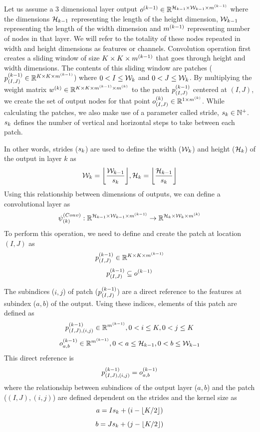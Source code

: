 Let us assume a 3 dimensional layer output $\ok{k-1} \inreal{\heightk{k-1} \times \widthk{k-1} \times \mk{k-1}}$ where the dimensions $\heightk{k-1}$ representing the length of the height dimension, $\widthk{k-1}$ representing the length of the width dimension and $\mk{k-1}$ representing number of nodes in that layer. We will refer to the totality of these nodes repeated in width and height dimensions as features or channels. Convolution operation first creates a sliding window of size $\kernelsize \times \kernelsize \times \mk{k-1}$ that goes through height and width dimensions. The contents of this sliding window are patches ($\pki{k-1}{(I,J)} \inreal{\kernelsize \times \kernelsize \times \mk{k-1}}$) where $0 < I \leq \widthk{k}$ and $0 < J \leq \widthk{k}$. By multiplying the weight matrix $\wk{k} \inreal{\kernelsize \times \kernelsize \times \mk{k-1} \times \mk{k}}$ to the patch $\pki{k-1}{(I,J)}$  centered at $(I,J)$, we create the set of output nodes for that point $\oki{k}{(I,J)} \inreal{1 \times \mk{k}}$. While calculating the patches, we also make use of a parameter called stride, $\sk{k} \in \mathbb{N}^+$. $\sk{k}$ defines the number of vertical and horizontal steps to take between each patch.

In other words, strides ($\sk{k}$) are used to define the width ($\widthk{k}$) and height ($\heightk{k}$) of the output in layer $k$ as
$$ \widthk{k} = \floor*{\frac{\widthk{k-1}}{\sk{k}}}, \heightk{k} = \floor*{\frac{\heightk{k-1}}{\sk{k}}}$$
Using this relationship between dimensions of outputs, we can define a convolutional layer as
$$ \convk{k} : \imagedimsk{k-1} \rightarrow \imagedimsk{k} $$
To perform this operation, we need to define and create the patch at location $(I,J)$ as 
$$ \pki{k-1}{(I,J)} \inreal{\kernelsize \times \kernelsize \times \mk{k-1}} $$
$$ \pki{k-1}{(I,J)} \subseteq \ok{k-1}$$

The subindices ($i,j$) of patch ($\pki{k-1}{(I,J)}$) are a direct reference to the features at subindex ($a,b$) of the output. Using these indices, elements of this patch are defined as
$$ \pki{k-1}{(I,J),(i,j)} \inreal{\mk{k-1}} , 0 < i \leq \kernelsize, 0 < j \leq \kernelsize$$
$$ \oki{k-1}{a,b} \inreal{\mk{k-1}} , 0 < a \leq \heightk{k-1}, 0 < b \leq  \widthk{k-1} $$
This direct reference is
$$ \pki{k-1}{(I,J),(i,j)} = \oki{k-1}{a,b} $$
where the relationship between subindices of the output layer ($a,b$) and the patch ($(I,J),(i,j)$) are defined dependent on the strides and the kernel size as
$$ a = I\sk{k} + (i - \floor*{\kernelsize/2}) $$
$$ b = J\sk{k} + (j - \floor*{\kernelsize/2}) $$

